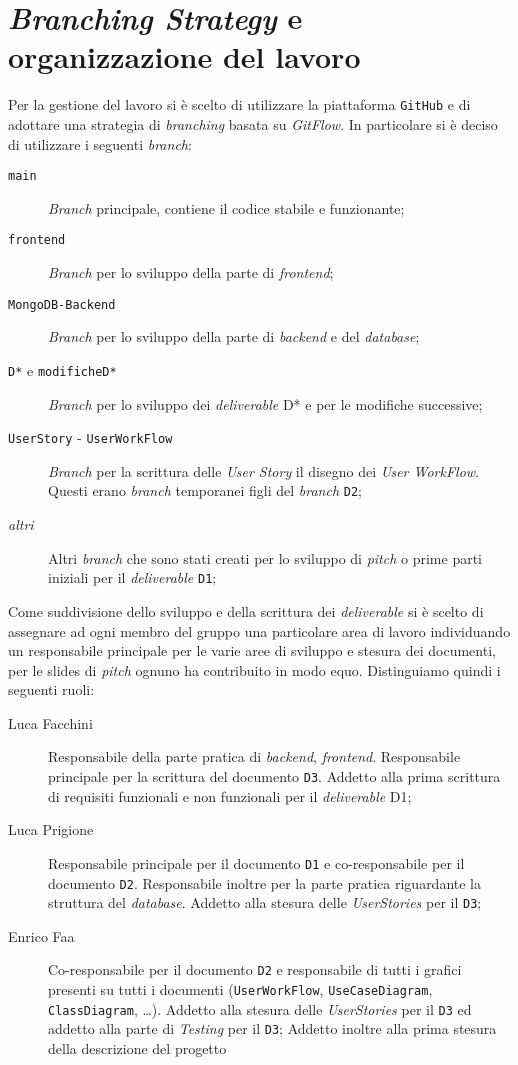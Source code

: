 \section{\textit{Branching Strategy} e organizzazione del lavoro}
    Per la gestione del lavoro si è scelto di utilizzare la piattaforma \texttt{GitHub} e di adottare una strategia di \textit{branching} basata su \textit{GitFlow}. In particolare si è deciso di utilizzare i seguenti \textit{branch}:
    \begin{description}
        \item[\texttt{main}] \textit{Branch} principale, contiene il codice stabile e funzionante;
        \item[\texttt{frontend}] \textit{Branch} per lo sviluppo della parte di \textit{frontend};
        \item[\texttt{MongoDB-Backend}] \textit{Branch} per lo sviluppo della parte di \textit{backend} e del \textit{database};
        \item[\texttt{D*} e \texttt{modificheD*}] \textit{Branch} per lo sviluppo dei \textit{deliverable} D* e per le modifiche successive;
        \item[\texttt{UserStory} - \texttt{UserWorkFlow}] \textit{Branch} per la scrittura delle \textit{User Story} il disegno dei \textit{User WorkFlow}. Questi erano \textit{branch} temporanei figli del \textit{branch} \texttt{D2};
        \item[\textit{altri}] Altri \textit{branch} che sono stati creati per lo sviluppo di \textit{pitch} o prime parti iniziali per il \textit{deliverable} \texttt{D1};
    \end{description}
    Come suddivisione dello sviluppo e della scrittura dei \textit{deliverable} si è scelto di assegnare ad ogni membro del gruppo una particolare area di lavoro individuando un responsabile principale per le varie aree di sviluppo e stesura dei documenti, per le slides di \textit{pitch} ognuno ha contribuito in modo equo. Distinguiamo quindi i seguenti ruoli:
    \begin{description}
        \item[Luca Facchini] Responsabile della parte pratica di \textit{backend}, \textit{frontend}. Responsabile principale per la scrittura del documento \texttt{D3}. Addetto alla prima scrittura di requisiti funzionali e non funzionali per il \textit{deliverable} D1; 
        \item[Luca Prigione] Responsabile principale per il documento \texttt{D1} e co-responsabile per il documento \texttt{D2}. Responsabile inoltre per la parte pratica riguardante la struttura del \textit{database}. Addetto alla stesura delle \textit{UserStories} per il \texttt{D3};
        \item[Enrico Faa] Co-responsabile per il documento \texttt{D2} e responsabile di tutti i grafici presenti su tutti i documenti (\texttt{UserWorkFlow}, \texttt{UseCaseDiagram}, \texttt{ClassDiagram}, \dots). Addetto alla stesura delle \textit{UserStories} per il \texttt{D3} ed addetto alla parte di \textit{Testing} per il \texttt{D3}; Addetto inoltre alla prima stesura della descrizione del progetto
    \end{description}
